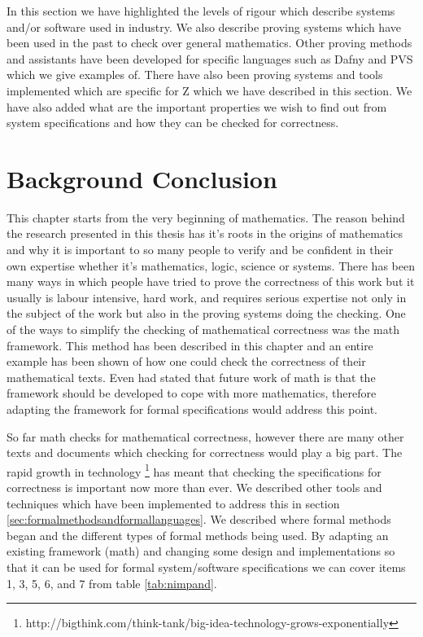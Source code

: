 In this section we have highlighted the levels of rigour which describe systems
and/or software used in industry. We also describe proving systems which have
been used in the past to check over general mathematics. Other proving methods
and assistants have been developed for specific languages such as Dafny and PVS
which we give examples of. There have also been proving systems and tools
implemented which are specific for Z which we have described in this section. We
have also added what are the important properties we wish to find out from
system specifications and how they can be checked for correctness.

\section{Background Conclusion}

This chapter starts from the very beginning of mathematics. The reason behind
the research presented in this thesis has it's roots in the origins of
mathematics and why it is important to so many people to verify and be confident
in their own expertise whether it's mathematics, logic, science or systems.
There has been many ways in which people have tried to prove the correctness of
this work but it usually is labour intensive, hard work, and requires serious
expertise not only in the subject of the work but also in the proving systems
doing the checking. One of the ways to simplify the checking of mathematical
correctness was the \gls{math} framework. This method has been described in this
chapter and an entire example has been shown of how one could check the
correctness of their mathematical texts. Even \cite{lamarphd} had stated
that future work of \gls{math} is that the framework should be developed to cope
with more mathematics, therefore adapting the framework for formal
specifications would address this point.

So far \gls{math} checks for mathematical correctness, however there are many
other texts and documents which checking for correctness would play a big part.
The rapid growth in technology
\footnote{http://bigthink.com/think-tank/big-idea-technology-grows-exponentially}
has meant that checking the specifications for
correctness is important now more than ever. We described other tools and
techniques which have been implemented to address this in section
\ref{sec:formalmethodsandformallanguages}.  We described where formal methods
began and the different types of formal methods being used. By adapting an existing
framework (\gls{math}) and changing some design and implementations so that it
can be used for formal system/software specifications we can cover items 1, 3,
5, 6, and 7 from table \ref{tab:nimpand}.

